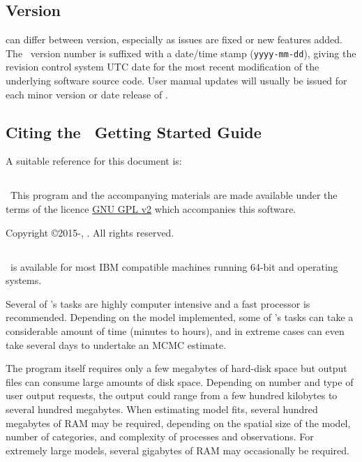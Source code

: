 \subsection{Version\label{sec:version}}

\CNAME can differ between version, especially as issues are fixed or new features added. The \CNAME\ version number is suffixed with a date/time stamp (\texttt{yyyy-mm-dd}), giving the revision control system UTC date for the most recent modification of the underlying software source code. User manual updates will usually be issued for each minor version or date release of \CNAME.

\subsection{Citing the \CNAME\ Getting Started Guide}
A suitable reference for this document is: 

\ManualRef{}
 
\subsection{}
\
This program and the accompanying materials are made available under the terms of the licence \href{http://www.gnu.org/licenses/old-licenses/gpl-2.0.en.html}{GNU GPL v2} which accompanies this software.

Copyright \copyright 2015-\SourceControlYearDoc, \href{http://www.niwa.co.nz}{\Organisation}. All rights reserved.

\subsection{}

\CNAME\ is available for most IBM compatible machines running 64-bit  and  operating systems.

Several of \CNAME's tasks are highly computer intensive and a fast processor is recommended. Depending on the model implemented, some of \CNAME's tasks can take a considerable amount of time (minutes to hours), and in extreme cases can even take several days to undertake an MCMC estimate. 

The program itself requires only a few megabytes of hard-disk space but output files can consume large amounts of disk space. Depending on number and type of user output requests, the output could range from a few hundred kilobytes to several hundred megabytes. When estimating model fits, several hundred megabytes of RAM may be required, depending on the spatial size of the model, number of categories, and complexity of processes and observations. For extremely large models, several gigabytes of RAM may occasionally be required. 

